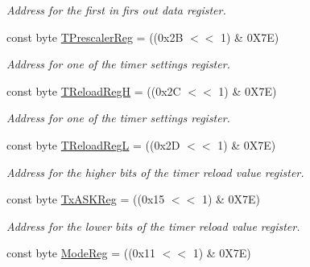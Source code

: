 \begin{DoxyCompactItemize}
\begin{DoxyCompactList}\small\item\em Address for the first in firs out data register. \end{DoxyCompactList}\item 
const byte \hyperlink{classmfrc522_a1b54b9b1e82ebc217c280928d1f567f1}{T\+Prescaler\+Reg} = ((0x2\+B $<$$<$ 1) \& 0\+X7\+E)\hypertarget{classmfrc522_a1b54b9b1e82ebc217c280928d1f567f1}{}\label{classmfrc522_a1b54b9b1e82ebc217c280928d1f567f1}

\begin{DoxyCompactList}\small\item\em Address for one of the timer settings register. \end{DoxyCompactList}\item 
const byte \hyperlink{classmfrc522_a491eb14159868a7aaf5c0d23ea5679f5}{T\+Reload\+RegH} = ((0x2\+C $<$$<$ 1) \& 0\+X7\+E)\hypertarget{classmfrc522_a491eb14159868a7aaf5c0d23ea5679f5}{}\label{classmfrc522_a491eb14159868a7aaf5c0d23ea5679f5}

\begin{DoxyCompactList}\small\item\em Address for one of the timer settings register. \end{DoxyCompactList}\item 
const byte \hyperlink{classmfrc522_a1bfa3adaddcb782565d871c0efed53d1}{T\+Reload\+RegL} = ((0x2\+D $<$$<$ 1) \& 0\+X7\+E)\hypertarget{classmfrc522_a1bfa3adaddcb782565d871c0efed53d1}{}\label{classmfrc522_a1bfa3adaddcb782565d871c0efed53d1}

\begin{DoxyCompactList}\small\item\em Address for the higher bits of the timer reload value register. \end{DoxyCompactList}\item 
const byte \hyperlink{classmfrc522_a365974a47e52e69d7008df3b37019ecd}{Tx\+A\+S\+K\+Reg} = ((0x15 $<$$<$ 1) \& 0\+X7\+E)\hypertarget{classmfrc522_a365974a47e52e69d7008df3b37019ecd}{}\label{classmfrc522_a365974a47e52e69d7008df3b37019ecd}

\begin{DoxyCompactList}\small\item\em Address for the lower bits of the timer reload value register. \end{DoxyCompactList}\item 
const byte \hyperlink{classmfrc522_a89d0eb6565c3c0c37dfde546f4cab24f}{Mode\+Reg} = ((0x11 $<$$<$ 1) \& 0\+X7\+E)\hypertarget{classmfrc522_a89d0eb6565c3c0c37dfde546f4cab24f}{}\label{classmfrc522_a89d0eb6565c3c0c37dfde546f4cab24f}


\end{DoxyCompactItemize}
